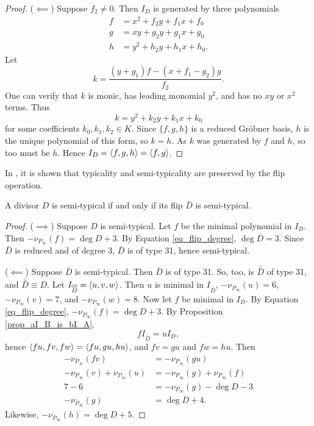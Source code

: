 \begin{proof}
  ($\impliedby$)
  Suppose $f_2 \neq 0$.
  Then $I_D$ is generated by three polynomials
  \begin{align*}
    f &= x^2 + f_2y + f_1x + f_0 \\
    g &= xy  + g_2y + g_1x + g_0 \\
    h &= y^2 + h_2y + h_1x + h_0.
  \end{align*}
  Let
  \[ k = \frac {(y + g_1)f - (x + f_1 - g_2)g} {f_2}. \]
  One can verify that $k$ is monic, has leading monomial $y^2$,
  and has no $xy$ or $x^2$ terms. Thus
  \[ k = y^2 + k_2y + k_1x + k_0 \]
  for some coefficients $k_0, k_1, k_2 \in K$.
  Since $\{f,g,h\}$ is a reduced Gr\"obner basis, $h$ is the unique polynomial of this form, so $k = h$.
  As $k$ was generated by $f$ and $h$, so too must be $h$.
  Hence $I_D = \left\langle f,g,h \right\rangle = \left\langle f,g \right\rangle$.
\end{proof}

In \cite{kmakdisi18}, it is shown that typicality and semi-typicality are preserved by the flip operation.
\begin{theorem}
  A divisor $D$ is semi-typical if and only if its flip $\bar D$ is semi-typical.
\end{theorem}
\begin{proof}
  ($\implies$)
  Suppose $D$ is semi-typical.
  Let $f$ be the minimal polynomial in $I_D$.
  Then $-\nu_{P_\infty}(f) = \deg D + 3$.
  By Equation \ref{eq_flip_degree}, $\deg \bar D = 3$.
  Since $\bar D$ is reduced and of degree 3, $\bar D$ is of type 31, hence semi-typical.
  
  ($\impliedby$)
  Suppose $\bar D$ is semi-typical.
  Then $\bar D$ is of type 31.
  So, too, is $\bar{\bar D}$ of type 31, and $\bar{\bar D} \equiv D$.
  Let $I_{\overline {\overline D}} = \left\langle u,v,w \right\rangle$.
  Then $u$ is minimal in $I_{\bar{\bar D}}$,
  $-\nu_{P_\infty}(u) = 6$, $-\nu_{P_\infty}(v) = 7$, and $-\nu_{P_\infty}(w) = 8$.
  Now let $f$ be minimal in $I_D$.
  By Equation \ref{eq_flip_degree}, $-\nu_{P_\infty}(f) = \deg D + 3$.
  By Proposition \ref{prop_aI_B_is_bI_A},
  \[ fI_{\bar{\bar D}} = uI_D, \]
  hence $\left\langle fu, fv, fw \right\rangle = \left\langle fu, gu, hu \right\rangle$, and $fv = gu$ and $fw = hu$.
  Then
  \begin{align*}
    -\nu_{P_\infty}(fv) &= -\nu_{P_\infty}(gu) \\
    -\nu_{P_\infty}(v) + \nu_{P_\infty}(u) &= -\nu_{P_\infty}(g) + \nu_{P_\infty}(f) \\
    7 - 6 &= -\nu_{P_\infty}(g) - \deg D - 3\\
    -\nu_{P_\infty}(g) &=  \deg D + 4.
  \end{align*}
  Likewise, $-\nu_{P_\infty}(h) =  \deg D + 5$.
\end{proof}

